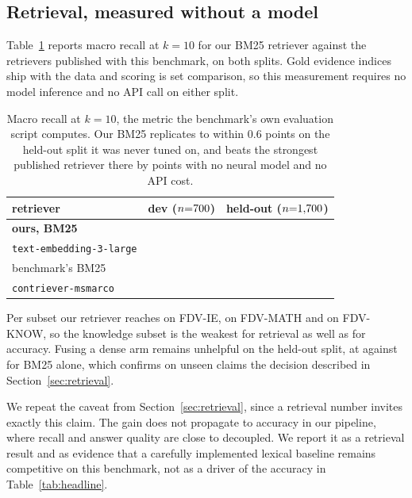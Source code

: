 \documentclass{article}
\begin{document}
\subsection{Retrieval, measured without a model}
\label{sec:retrievalresults}

Table~\ref{tab:recall} reports macro recall at $k{=}10$ for our BM25 retriever against the
retrievers published with this benchmark, on both splits. Gold evidence indices ship with
the data and scoring is set comparison, so this measurement requires no model inference and
no API call on either split.

\begin{table}[t]
\caption{Macro recall at $k{=}10$, the metric the benchmark's own evaluation script computes.
Our BM25 replicates to within 0.6 points on the held-out split it was never tuned on, and
beats the strongest published retriever there by \recallGainTest{} points with no neural
model and no API cost.}
\label{tab:recall}
\centering
\begin{tabular}{lcc}
\toprule
retriever & dev ($n{=}700{}$) & held-out ($n{=}1{,}700{}$) \\
\midrule
\textbf{ours, BM25}                & \textbf{\recallOursDev{}} & \textbf{\recallOursTest{}} \\
\texttt{text-embedding-3-large}    & \recallEmbedDev{}         & \recallEmbedTest{} \\
benchmark's BM25                   & \recallUpstreamBMDev{}    & \recallUpstreamBMTest{} \\
\texttt{contriever-msmarco}        & \recallContrieverDev{}    & \recallContrieverTest{} \\
\bottomrule
\end{tabular}
\end{table}

Per subset our retriever reaches \recallOursIETest{} on FDV-IE, \recallOursMATHTest{} on
FDV-MATH and \recallOursKNOWTest{} on FDV-KNOW, so the knowledge subset is the weakest for
retrieval as well as for accuracy. Fusing a dense arm remains unhelpful on the held-out
split, at \recallFusionTest{} against \recallOursTest{} for BM25 alone, which confirms on
unseen claims the decision described in Section~\ref{sec:retrieval}.

We repeat the caveat from Section~\ref{sec:retrieval}, since a retrieval number invites
exactly this claim. The gain does not propagate to accuracy in our pipeline, where recall
and answer quality are close to decoupled. We report it as a retrieval result and as
evidence that a carefully implemented lexical baseline remains competitive on this
benchmark, not as a driver of the accuracy in Table~\ref{tab:headline}.
\end{document}
